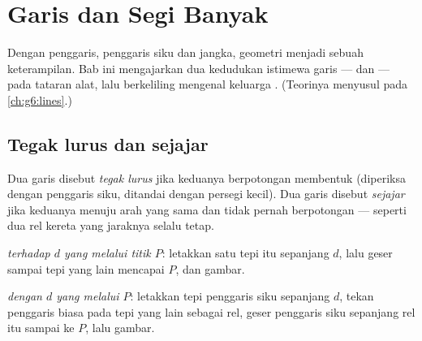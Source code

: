 \chapter{Garis dan Segi Banyak}\label{ch:g4:geometry}

Dengan penggaris, penggaris siku dan jangka, geometri menjadi sebuah
keterampilan. Bab ini mengajarkan dua kedudukan istimewa garis ---
 dan  --- pada tataran alat, lalu berkeliling
mengenal keluarga . (Teorinya menyusul pada
\cref{ch:g6:lines}.)

\section{Tegak lurus dan sejajar}

\begin{definition}\label{def:g4:geometry:def}
Dua garis disebut \emph{tegak lurus} jika
keduanya berpotongan membentuk  (diperiksa dengan
penggaris siku, ditandai dengan persegi kecil). Dua garis disebut
\emph{sejajar} jika keduanya menuju arah yang
sama dan tidak pernah berpotongan --- seperti dua rel kereta yang
jaraknya selalu tetap.
\end{definition}

\begin{method}\label{met:g4:geometry:draw}
\emph{ terhadap $d$ yang melalui titik $P$}:
letakkan satu tepi  itu sepanjang $d$, lalu geser
sampai tepi yang lain mencapai $P$, dan gambar.

\emph{ dengan $d$ yang melalui $P$}: letakkan tepi
penggaris siku sepanjang $d$, tekan penggaris biasa pada tepi yang
lain sebagai rel, geser penggaris siku sepanjang rel itu sampai ke
$P$, lalu gambar.
\end{method}

